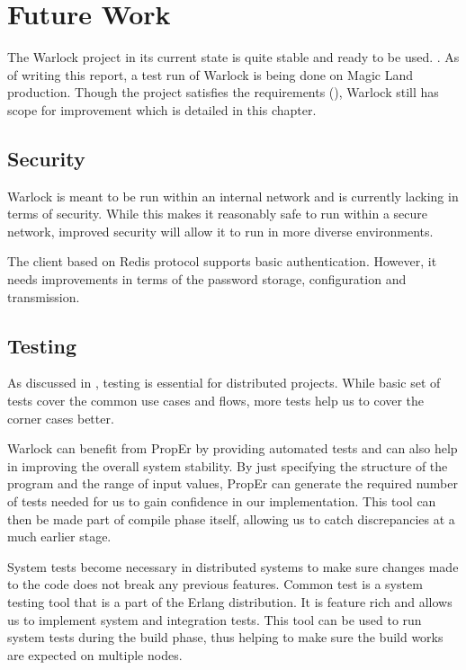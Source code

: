 \chapter{Future Work}
\label{chapter:future.work}

The Warlock project in its current state is quite stable and ready to be used.%
. As of writing this report, a test run of Warlock is being done on Magic Land
production. Though the project satisfies the requirements
 (), Warlock still has scope for improvement which is
 detailed in this chapter.

\section{Security}

Warlock is meant to be run within an internal network and is currently lacking
in terms of security. While this makes it reasonably safe to run within a secure
network, improved security will allow it to run in more diverse environments.

The client based on Redis protocol supports basic authentication. However, it
needs improvements in terms of the password storage, configuration and
transmission.

\section{Testing}

As discussed in , testing is essential for distributed
projects. While basic set of tests cover the common use cases and flows, more
tests help us to cover the corner cases better.

Warlock can benefit from PropEr%
by providing automated tests and can also help in improving the overall
system stability. By just specifying the structure of the program and the range
of input values, PropEr can generate the required number of tests needed for
us to gain confidence in our implementation. This tool can then be made
part of compile phase itself, allowing us to catch discrepancies at a much
earlier stage.

System tests%
become necessary in distributed systems to make sure changes made to the code
does not break any previous features. Common test \citep{common.test} is a
system testing tool that is a part of the Erlang distribution. It is feature
rich and allows us to implement system and integration tests. This tool can
be used to run system tests during the build phase, thus helping to make sure
the build works are expected on multiple nodes.

